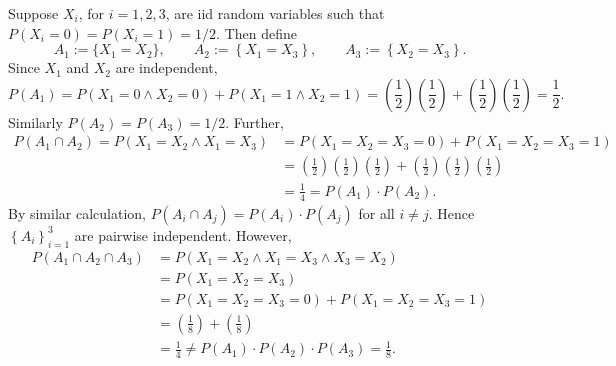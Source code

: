 \documentclass[12pt]{article}
\begin{document}
Suppose $X_{i}$, for $i = 1,2,3$, are iid random variables such that $P(X_{i} = 0) = P(X_{i} = 1) = 1/2$. Then define 
\[ A_{1} := \{X_{1} = X_{2}\}, \qquad A_{2} := \left\{ X_{1} = X_{3} \right\}, \qquad A_{3} := \left\{ X_{2} = X_{3} \right\}. \]
Since $X_{1}$ and $X_{2}$ are independent, 
\[ P(A_{1}) = P(X_{1} = 0 \wedge X_{2} = 0) + P(X_{1} = 1 \wedge X_{2} = 1) = \left( \frac{1}{2} \right)\left( \frac{1}{2} \right) + 
\left( \frac{1}{2} \right)\left( \frac{1}{2} \right) = \frac{1}{2}. \]
Similarly $P(A_{2}) = P(A_{3}) = 1/2$. Further,
\begin{align*}
P(A_{1}\cap A_{2}) = P(X_{1} = X_{2} \wedge X_{1} = X_{3}) & = P(X_{1} = X_{2} = X_{3} = 0) + P(X_{1} = X_{2} = X_{3} = 1) \\
& = \left( \frac{1}{2} \right)\left( \frac{1}{2} \right)\left( \frac{1}{2} \right) + \left( \frac{1}{2} \right)\left( \frac{1}{2} \right)\left(
\frac{1}{2} \right) \\
& = \frac{1}{4} = P(A_{1})\cdot P(A_{2}).
\end{align*}
By similar calculation, $P(A_{i}\cap A_{j}) = P(A_{i})\cdot P(A_{j})$ for all $i \neq j$. Hence $\left\{ A_{i} \right\}_{i=1}^{3}$ are pairwise
independent. However,
\begin{align*}
P(A_{1} \cap A_{2} \cap A_{3}) & = P(X_{1} = X_{2} \wedge X_{1} = X_{3} \wedge X_{3} = X_{2}) \\
& = P(X_{1} = X_{2} = X_{3}) \\
& = P(X_{1} = X_{2} = X_{3} = 0) + P(X_{1} = X_{2} = X_{3} = 1) \\
& = \left( \frac{1}{8} \right) + \left( \frac{1}{8} \right) \\
& = \frac{1}{4} \neq P(A_{1})\cdot P(A_{2}) \cdot P(A_{3}) = \frac{1}{8}.
\end{align*}
\end{document}
